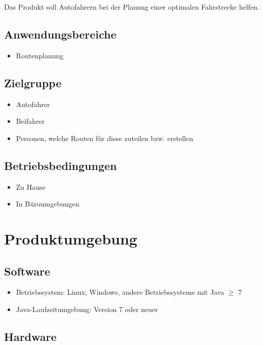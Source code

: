 \documentclass[a4paper, 11pt]{article}
\begin{document}
Das Produkt soll Autofahrern bei der Planung einer optimalen Fahrstrecke helfen.

\subsection{Anwendungsbereiche}
\begin{itemize}
\item Routenplanung
\end{itemize}

\subsection{Zielgruppe}
\begin{itemize}
\item Autofahrer
\item Beifahrer
\item Personen, welche Routen für diese zuteilen bzw. erstellen
\end{itemize}

\subsection{Betriebsbedingungen}
\begin{itemize}
\item Zu Hause
\item In Büroumgebungen
\end{itemize}

\section{Produktumgebung}

\subsection{Software}\label{subsec:Software}

\begin{itemize}
\item Betriebssystem: Linux, Windows, andere Betriebssysteme mit Java $\geq$ 7
\item Java-Laufzeitumgebung: Version 7 oder neuer
\end{itemize}

\subsection{Hardware}
\end{document}
